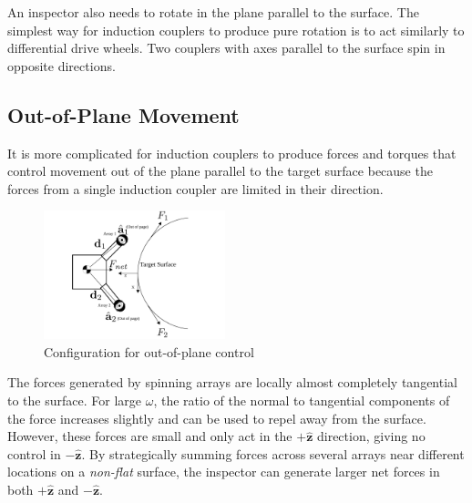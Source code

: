 \documentclass[letterpaper, 10 pt, conference]{ieeeconf}  %
\newcommand{\matt}[1]{{\color{darkgreen}\small\par {[{\bf Matt says:} {\em #1}} ] \\    }}
\newcommand{\ben}[1]{{\color{red}\small\par {[{\bf Ben says:} {\em #1}} ] \\    }}
\begin{document}
      
An inspector also needs to rotate in the plane parallel to the surface. The simplest way for induction couplers to produce pure rotation is to act similarly to differential drive wheels. Two couplers with axes parallel to the surface spin in opposite directions.

 


\subsection{Out-of-Plane Movement}\label{sec:oop_movement_desc}

It is more complicated for induction couplers to produce forces and torques that control movement out of the plane parallel to the target surface because the forces from a single induction coupler are limited in their direction. 

  \begin{figure}[thpb]
      \centering
      \includegraphics[width = 0.47\textwidth]{figures/curve_locomotion.pdf}
      \caption{Configuration for out-of-plane control}
      \label{fig:oopsetup}
   \end{figure}
   
\par The forces generated by spinning arrays are locally almost completely tangential to the surface. For large $\omega$, the ratio of the normal to tangential components of the force increases slightly and can be used to repel away from the surface. However, these forces are small and only act in the $+\hat{\textbf{z}}$ direction, giving no control in $-\hat{\textbf{z}}$. By strategically summing forces across several arrays near different locations on a \textit{non-flat} surface, the inspector can generate larger net forces in both $+\hat{\textbf{z}}$ and $-\hat{\textbf{z}}$. 
\end{document}
